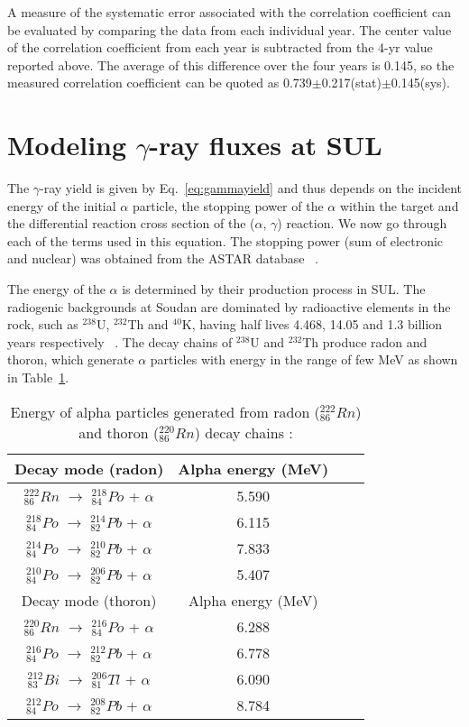 \documentclass[aps,prc,showpacs,twocolumn,superscriptaddress]{revtex4-1}
\begin{document}
A measure of the systematic error associated with the correlation coefficient can be evaluated by comparing the data from each individual year. The center value of the correlation coefficient from each year  is subtracted from the 4-yr value reported above.  The average of this difference over the four years is 0.145, so the measured correlation coefficient can be quoted as 0.739$\pm$0.217(stat)$\pm$0.145(sys).
  
\section{Modeling $\gamma$-ray fluxes at SUL}
The $\gamma$-ray yield is given by Eq.~\ref{eq:gammayield}
and thus depends on the incident energy of the initial $\alpha$ particle, the stopping power of the $\alpha$ within the target and the differential reaction cross section of the ($\alpha$, $\gamma$) reaction.  We now go through each of the terms used in this equation.  The stopping power (sum of electronic and nuclear) was obtained from the ASTAR database ~\cite{astar}. 

The energy of the $\alpha$ is determined by their production process in SUL.  The radiogenic backgrounds at Soudan are dominated by radioactive elements in the rock, such as $^{238}$U, $^{232}$Th and $^{40}$K, having half lives 4.468, 14.05 and 1.3 billion years respectively ~\cite{data}. The decay chains of $^{238}$U and $^{232}$Th produce radon and thoron, which generate $\alpha$ particles with energy in the range of few MeV as shown in Table~\ref{table1}.  
\begin{table}[h!]
\centering
\begin{tabular}{|c|c|c|c|}
\hline 
Decay mode (radon) & Alpha energy (MeV) \\ 
\hline
$^{222}_{86}Rn$ $\rightarrow$ $^{218}_{84}Po$ + $\alpha$ & 5.590 \\ 
\hline 
$^{218}_{84}Po$ $\rightarrow$ $^{214}_{82}Pb$ + $\alpha$ & 6.115 \\ 
\hline 
$^{214}_{84}Po$ $\rightarrow$ $^{210}_{82}Pb$ + $\alpha$ & 7.833 \\ 
\hline
$^{210}_{84}Po$ $\rightarrow$ $^{206}_{82}Pb$ + $\alpha$ & 5.407 \\
\hline
\hline
Decay mode (thoron) & Alpha energy (MeV) \\ 
\hline
$^{220}_{86}Rn$ $\rightarrow$ $^{216}_{84}Po$ + $\alpha$ & 6.288 \\ 
\hline 
$^{216}_{84}Po$ $\rightarrow$ $^{212}_{82}Pb$ + $\alpha$ & 6.778 \\ 
\hline 
$^{212}_{83}Bi$ $\rightarrow$ $^{206}_{81}Tl$ + $\alpha$ & 6.090 \\ 
\hline
$^{212}_{84}Po$ $\rightarrow$ $^{208}_{82}Pb$ + $\alpha$ & 8.784 \\
\hline
\end{tabular}
\caption{Energy of alpha particles generated from radon ($^{222}_{86}Rn$) and thoron ($^{220}_{86}Rn$) decay chains \cite{isotop1}:}
\label{table1}
\end{table}
\end{document}

